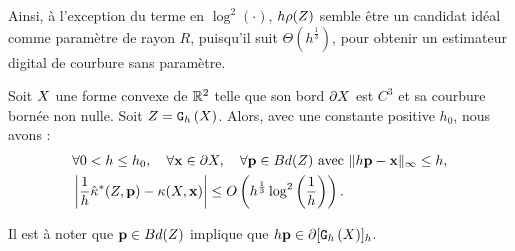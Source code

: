 Ainsi, à l'exception du terme en $\log^2(\cdot)$, $h \rho(Z)$ semble être
un candidat idéal comme paramètre de rayon $R$, puisqu'il suit
$\Theta(h^\frac{1}{3})$, pour obtenir un estimateur digital de
courbure sans paramètre.
%
\begin{theorem}{}
\label{thm:curvature-estimator-2d-pf-conv}
  Soit $X$ une forme convexe de $\mathbb{R}^2$ telle que son bord $\partial X$ est
  $C^3$ et sa courbure bornée non nulle. Soit $Z = \mathtt{G}_{h}\left(X\right)$. Alors, avec une
  constante positive $h_0$, nous avons :
  \begin{align}
    &\forall 0 < h \le h_0, \quad \forall \mathbf{x} \in \partial X, \quad \forall \mathbf{p} \in Bd({Z}) \text{~avec~} \| h\mathbf{p} -\mathbf{x}\|_\infty \le h, \nonumber\\
    &\left | \frac{1}{h}\hat{\kappa}^{*}(Z,\mathbf{p}) - \kappa(X,\mathbf{x}) \right| \le O\left( h^{\frac{1}{3}} \log^2 \left(\frac{1}{h}\right)\right) .
  \end{align}
\end{theorem}
%
Il est à noter que $\mathbf{p} \in Bd({Z})$ implique que $h\mathbf{p} \in
\partial \lbrack \mathtt{G}_{h}\left(X\right) \rbrack_{h}$.


